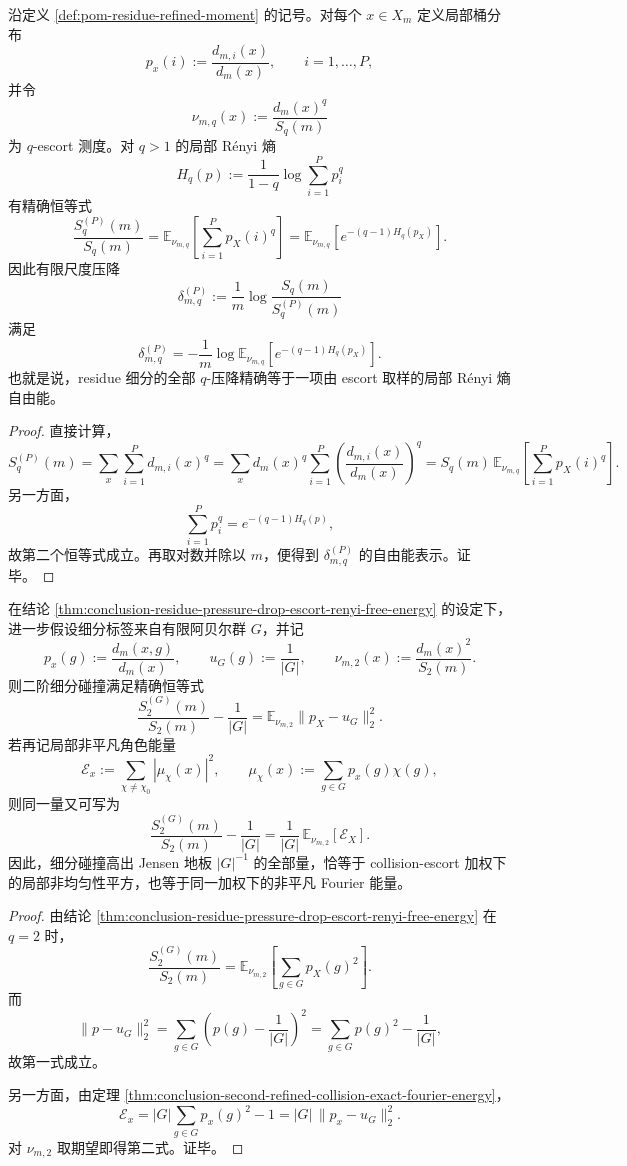 \begin{theorem}\label{thm:conclusion-residue-pressure-drop-escort-renyi-free-energy}
沿定义 \ref{def:pom-residue-refined-moment} 的记号。对每个 \(x\in X_m\) 定义局部桶分布
\[
p_x(i):=\frac{d_{m,i}(x)}{d_m(x)},
\qquad
i=1,\dots,P,
\]
并令
\[
\nu_{m,q}(x):=\frac{d_m(x)^q}{S_q(m)}
\]
为 \(q\)-escort 测度。对 \(q>1\) 的局部 Rényi 熵
\[
H_q(p):=\frac{1}{1-q}\log\sum_{i=1}^{P}p_i^q
\]
有精确恒等式
\[
\frac{S_q^{(P)}(m)}{S_q(m)}
=
\mathbb E_{\nu_{m,q}}\!\left[\sum_{i=1}^{P}p_X(i)^q\right]
=
\mathbb E_{\nu_{m,q}}\!\left[e^{-(q-1)H_q(p_X)}\right].
\]
因此有限尺度压降
\[
\delta_{m,q}^{(P)}:=
\frac1m\log\frac{S_q(m)}{S_q^{(P)}(m)}
\]
满足
\[
\delta_{m,q}^{(P)}
=
-\frac1m\log
\mathbb E_{\nu_{m,q}}\!\left[e^{-(q-1)H_q(p_X)}\right].
\]
也就是说，residue 细分的全部 \(q\)-压降精确等于一项由 escort 取样的局部 Rényi 熵自由能。
\end{theorem}
\begin{proof}
直接计算，
\[
S_q^{(P)}(m)
=
\sum_x\sum_{i=1}^{P}d_{m,i}(x)^q
=
\sum_x d_m(x)^q\sum_{i=1}^{P}\left(\frac{d_{m,i}(x)}{d_m(x)}\right)^q
=
S_q(m)\,
\mathbb E_{\nu_{m,q}}\!\left[\sum_{i=1}^{P}p_X(i)^q\right].
\]
另一方面，
\[
\sum_{i=1}^{P}p_i^q=e^{-(q-1)H_q(p)},
\]
故第二个恒等式成立。再取对数并除以 \(m\)，便得到 \(\delta_{m,q}^{(P)}\) 的自由能表示。证毕。
\end{proof}

\begin{theorem}[二阶细分碰撞的加权均匀化恒等式]\label{thm:conclusion-second-order-refined-collision-weighted-uniformization}
在结论 \ref{thm:conclusion-residue-pressure-drop-escort-renyi-free-energy} 的设定下，进一步假设细分标签来自有限阿贝尔群 \(G\)，并记
\[
p_x(g):=\frac{d_m(x,g)}{d_m(x)},
\qquad
u_G(g):=\frac1{|G|},
\qquad
\nu_{m,2}(x):=\frac{d_m(x)^2}{S_2(m)}.
\]
则二阶细分碰撞满足精确恒等式
\[
\frac{S_2^{(G)}(m)}{S_2(m)}-\frac1{|G|}
=
\mathbb E_{\nu_{m,2}}\|p_X-u_G\|_2^2.
\]
若再记局部非平凡角色能量
\[
\mathcal E_x:=\sum_{\chi\neq\chi_0}|\mu_\chi(x)|^2,
\qquad
\mu_\chi(x):=\sum_{g\in G}p_x(g)\chi(g),
\]
则同一量又可写为
\[
\frac{S_2^{(G)}(m)}{S_2(m)}-\frac1{|G|}
=
\frac1{|G|}\,\mathbb E_{\nu_{m,2}}[\mathcal E_X].
\]
因此，细分碰撞高出 Jensen 地板 \(|G|^{-1}\) 的全部量，恰等于 collision-escort 加权下的局部非均匀性平方，也等于同一加权下的非平凡 Fourier 能量。
\end{theorem}
\begin{proof}
由结论 \ref{thm:conclusion-residue-pressure-drop-escort-renyi-free-energy} 在 \(q=2\) 时，
\[
\frac{S_2^{(G)}(m)}{S_2(m)}
=
\mathbb E_{\nu_{m,2}}\!\left[\sum_{g\in G}p_X(g)^2\right].
\]
而
\[
\|p-u_G\|_2^2
=
\sum_{g\in G}\left(p(g)-\frac1{|G|}\right)^2
=
\sum_{g\in G}p(g)^2-\frac1{|G|},
\]
故第一式成立。

另一方面，由定理 \ref{thm:conclusion-second-refined-collision-exact-fourier-energy}，
\[
\mathcal E_x
=
|G|\sum_{g\in G}p_x(g)^2-1
=
|G|\,\|p_x-u_G\|_2^2.
\]
对 \(\nu_{m,2}\) 取期望即得第二式。证毕。
\end{proof}

